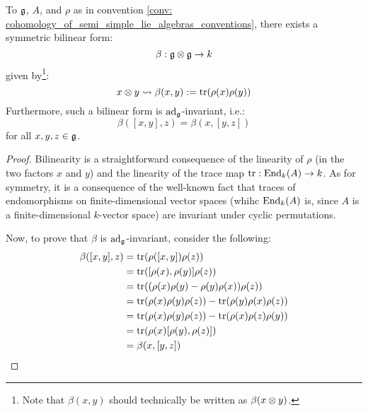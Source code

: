                     \begin{proposition} \label{prop: associated_invariant_bilinear_forms_of_lie_algebras}
                        To $\mathfrak{g}$, $A$, and $\rho$ as in convention \ref{conv: cohomology_of_semi_simple_lie_algebras_conventions}, there exists a symmetric bilinear form:
                            $$\beta: \g \tensor \g \to k$$
                        given by\footnote{Note that $\beta(x, y)$ should technically be written as $\beta(x \tensor y)$.}:
                            $$x \tensor y \mapsto \beta(x, y) := \trace(\rho(x) \rho(y))$$
                        Furthermore, such a bilinear form is $\mathrm{ad}_{\mathfrak{g}}$-invariant, i.e.:
                            $$\beta([x, y], z) = \beta(x, [y, z])$$
                        for all $x, y, z \in \mathfrak{g}$.
                    \end{proposition}
                        \begin{proof}
                            Bilinearity is a straightforward consequence of the linearity of $\rho$ (in the two factors $x$ and $y$) and the linearity of the trace map $\operatorname{tr}: \mathrm{End}_k(A) \to k$. As for symmetry, it is a consequence of the well-known fact that traces of endomorphisms on finite-dimensional vector spaces (whihc $\mathrm{End}_k(A)$ is, since $A$ is a finite-dimensional $k$-vector space) are invariant under cyclic permutations.
                            
                            Now, to prove that $\beta$ is $\mathrm{ad}_{\mathfrak{g}}$-invariant, consider the following:
                                $$
                                    \begin{aligned}
                                        \beta([x, y], z) & = \operatorname{tr}(\rho([x, y]) \rho(z))
                                        \\
                                        & = \operatorname{tr}([\rho(x), \rho(y)] \rho(z))
                                        \\
                                        & = \operatorname{tr}((\rho(x)\rho(y) - \rho(y)\rho(x)) \rho(z))
                                        \\
                                        & = \operatorname{tr}(\rho(x) \rho(y)\rho(z)) - \operatorname{tr}(\rho(y)\rho(x)\rho(z))
                                        \\
                                        & = \operatorname{tr}(\rho(x) \rho(y)\rho(z)) - \operatorname{tr}(\rho(x)\rho(z)\rho(y))
                                        \\
                                        & = \operatorname{tr}(\rho(x)[\rho(y), \rho(z)])
                                        \\
                                        & = \beta(x, [y, z])
                                    \end{aligned}
                                $$
                        \end{proof}
